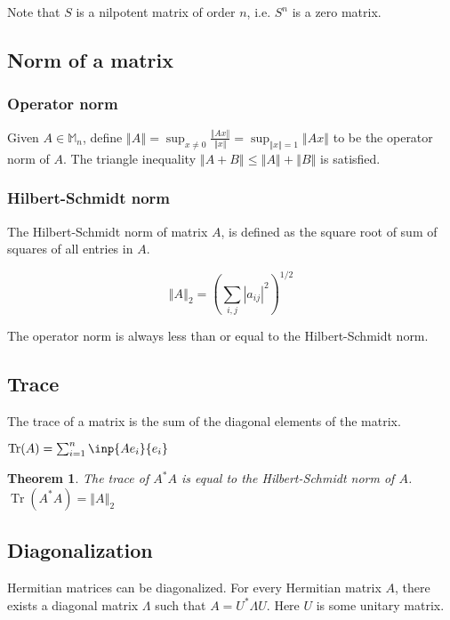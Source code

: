 \documentclass[twofold]{article}
\newcommand*\adj[1]{#1^*}
\newcommand*\norm[1]{\left \Vert #1 \right\Vert}
\newcommand*\abs[1]{\left \vert #1 \right\vert}
\DeclareMathOperator{\Tr}{Tr}
\theoremstyle{plain}
\newtheorem*{theorem}{Theorem}
\theoremstyle{definition}
\begin{document}
 Note that \(S\) is a nilpotent matrix of order \(n\), i.e. \(S^n\) is a zero matrix.


\subsection{Norm of a matrix}

\subsubsection{Operator norm}
Given \(A \in \mathbb{M}_n\), define \(\norm{A} =\displaystyle \sup _{x \neq 0} \frac{\norm{Ax}}{\norm{x}} = \sup_{\norm{x} = 1} \norm{Ax} \) to be the operator norm of \(A\). The triangle inequality \(\norm{A + B} \leq \norm{A} + \norm{B}\) is satisfied. 

\subsubsection{Hilbert-Schmidt norm}

The Hilbert-Schmidt norm of matrix \(A\), is defined as the square root of sum of squares of all entries in \(A\). 

 \[\norm{A}_2 = \left( \sum_{i, j} \abs{a_{ij}}^2 \right) ^{1/2}\]


The operator norm is always less than or equal to the Hilbert-Schmidt norm.

\subsection{Trace}
The trace of a matrix is the sum of the diagonal elements of the matrix. 

\(\Tr(A) = \sum_{i=1} ^n \inp{Ae_i}{ e_i}\)

\begin{theorem}The trace of \(\adj{A}A\) is equal to the Hilbert-Schmidt norm of \(A\). \(\Tr( \adj{A} A ) = \norm{A}_2\)\end{theorem}

\subsection{Diagonalization}


Hermitian matrices can be diagonalized. For every Hermitian matrix \(A\), there exists a diagonal matrix \(\Lambda\) such that \(A = \adj{U}  \Lambda U\). Here \(U\) is some unitary matrix. 
\end{document}
